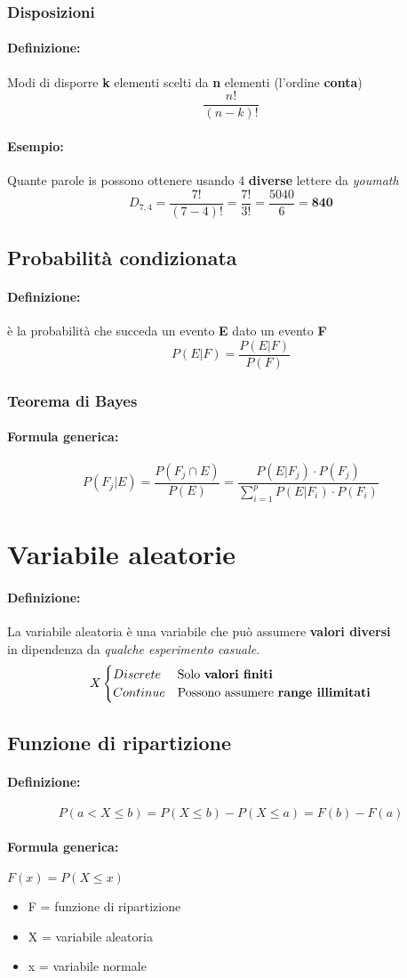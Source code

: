 \documentclass[]{article}
\newcommand{\definizione}{\paragraph{Definizione:}}
\newcommand{\formula}{\paragraph{Formula generica:}}
\begin{document}
    \subsubsection{Disposizioni}
    \definizione Modi di disporre \textbf{k} elementi scelti da \textbf{n} elementi (l'ordine \textbf{conta})
    \[ \frac{n!}{(n-k)!}\]
    \paragraph{Esempio:} Quante parole is possono ottenere usando 4 \textbf{diverse} lettere da \textit{youmath} 
    \[ D_{7,4} = \frac{7!}{(7-4)!} = \frac{7!}{3!} = \frac{5040}{6} = \textbf{840} \]



    \subsection{Probabilità condizionata}
    \definizione è la probabilità che succeda un evento \textbf{E} dato un evento \textbf{F}
    \[ P(E | F) = \frac{P(E | F)}{P(F)}\]

    \subsubsection{Teorema di Bayes}
    \formula \[ P(F_j | E) = \frac{P(F_j \cap E)}{P(E)} = \frac{P(E | F_j) \cdot P(F_j)}{\sum_{i = 1}^{p} P(E | F_i) \cdot P(F_i)} \]
    \begin{center} 
    \end{center}

    \section{Variabile aleatorie}
    \definizione La variabile aleatoria è una variabile che può assumere \textbf{valori diversi} \\ 
    in dipendenza da \textit{qualche esperimento casuale}.
    \[
        X
        \begin{cases}
            Discrete & \text{Solo \textbf{valori finiti}} \\
            Continue & \text{Possono assumere \textbf{range illimitati}}
        \end{cases}
    \]
    \subsection{Funzione di ripartizione}
    \definizione
    \[ P(a < X \leq b) = P(X \leq b) - P(X \leq a) = F(b) - F(a)\]
    \formula $ F(x) = P(X \leq x) $
    \begin{itemize}
        \item F = funzione di ripartizione
        \item X = variabile aleatoria
        \item x = variabile normale
    \end{itemize}
    
\end{document}
